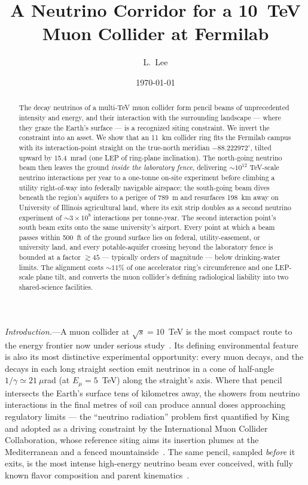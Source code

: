\documentclass[aps,prl,reprint,superscriptaddress,nofootinbib]{revtex4-2}
\begin{document}
\title{A Neutrino Corridor for a 10~TeV Muon Collider at Fermilab}

\author{L.~Lee}

\date{\today}

\begin{abstract}
The decay neutrinos of a multi-TeV muon collider form pencil beams of
unprecedented intensity and energy, and their interaction with the
surrounding landscape --- where they graze the Earth's surface --- is a
recognized siting constraint. We invert the constraint into an asset. We
show that an 11~km collider ring fits the Fermilab campus with its
interaction-point straight on the true-north meridian $-88.222972^\circ$,
tilted upward by 15.4~mrad (one LEP of ring-plane inclination). The
north-going neutrino beam then leaves the ground \emph{inside the
laboratory fence}, delivering ${\sim}10^{12}$ TeV-scale neutrino
interactions per year to a one-tonne on-site experiment before climbing a
utility right-of-way into federally navigable airspace; the south-going
beam dives beneath the region's aquifers to a perigee of 789~m and
resurfaces 198~km away on University of Illinois agricultural land, where
its exit strip doubles as a second neutrino experiment of
${\sim}3\times10^{8}$ interactions per tonne-year. The second interaction point's
south beam exits onto the same university's airport. Every point at which
a beam passes within 500~ft of the ground surface lies on federal,
utility-easement, or university land, and every potable-aquifer crossing
beyond the laboratory fence is bounded at a factor ${\gtrsim}45$ ---
typically orders of magnitude --- below drinking-water limits. The
alignment costs ${\sim}11\%$ of one accelerator ring's circumference and
one LEP-scale plane tilt, and converts the muon collider's defining
radiological liability into two shared-science facilities.
\end{abstract}

\maketitle

\emph{Introduction.}---A muon collider at
$\sqrt{s}=10$~TeV is the most compact route to the
energy frontier now under serious study~\cite{MCForum,IMCC}. Its defining
environmental feature is also its most distinctive experimental
opportunity: every muon decays, and the decays in each long straight
section emit neutrinos in a cone of half-angle
$1/\gamma \simeq 21~\mu$rad (at $E_\mu = 5$~TeV) along the straight's
axis. Where that pencil intersects the Earth's surface tens of kilometres
away, the showers from neutrino interactions in the final metres of soil
can produce annual doses approaching regulatory limits --- the
``neutrino radiation'' problem first quantified by King~\cite{King} and
adopted as a driving constraint by the International Muon Collider
Collaboration, whose reference siting aims its insertion plumes at the
Mediterranean and a fenced mountainside~\cite{IMCC}. The same pencil,
sampled \emph{before} it exits, is the most intense high-energy neutrino
beam ever conceived, with fully known flavor composition and parent
kinematics~\cite{NuSlice}.
\end{document}
